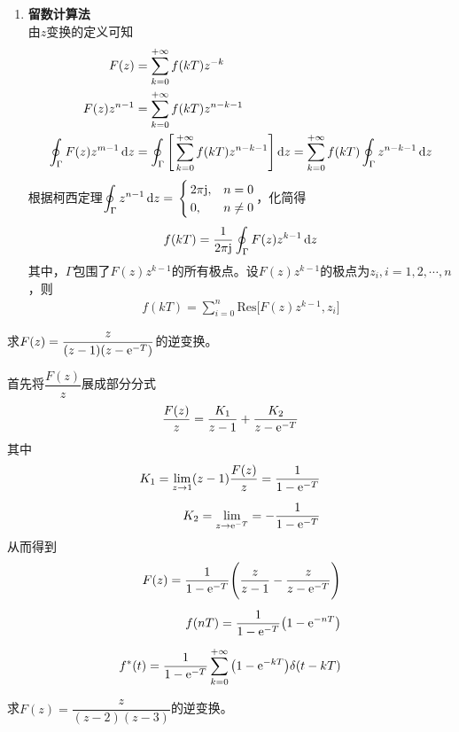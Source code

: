 \begin{enumerate}[\textbf{方法} 1 ]
	\item \textbf{留数计算法}\\
	由$z$变换的定义可知
	\begin{align}
		F(z) &= \sum_{k=0}^{+\infty} f(kT)z^{-k}\\
		F(z)z^{n-1} &= \sum_{k=0}^{+\infty}f(kT)z^{n-k-1}\\
		\oint_\Gamma F(z)z^{m-1}\,{\rm{d}} z &=\oint_\Gamma \Bigg[\sum_{k=0}^{+\infty}f(kT)z^{n-k-1}\Bigg]\,{\rm{d}} z = \sum_{k=0}^{+\infty} f(kT)\oint_\Gamma z^{n-k-1}\,{\rm{d}} z
	\end{align}
	根据柯西定理$\displaystyle \oint_\Gamma z^{n-1}\, {\rm{d}} z = 
	\,
	\begin{cases}
		\, 2\pi \text{j}, &n = 0\\
		\, 0, & n \neq 0
	\end{cases}
	$，化简得
	\begin{align}
		f(kT) = \dfrac{1}{2\pi\text{j}} \oint_\Gamma F(z)z^{k-1} \, {\rm{d}} z
	\end{align}
	其中，$\Gamma$包围了$F(z)z^{k-1}$的所有极点。设$F(z)z^{k-1}$的极点为$z_i,i=1,2,\cdots,n$，则
	\begin{align}
		f(kT) = \sum_{i=0}^n \text{Res}\big[F(z)z^{k-1},z_i\big]
	\end{align}
\end{enumerate}

\examples 求$F(z)=\dfrac{z}{(z-1)(z-{\rm{e}}^{-T})}$的逆变换。

\solve 首先将$\dfrac{F(z)}{z}$展成部分分式
\[
\dfrac{F(z)}{z} = \dfrac{K_1}{z-1} + \dfrac{K_2}{z-{\rm{e}}^{-T}}
\]
其中
\begin{align*}
	K_1 = \lim\limits_{z \to 1} (z-1)\dfrac{F(z)}{z} = \dfrac{1}{1- {\rm{e}}^{-T}}\\[0.5em]
	K_2 = \lim\limits_{z \to {\rm{e}}^{-T}} = - \dfrac{1}{1 - {\rm{e}}^{-T}}
\end{align*}
从而得到
\begin{align}
	F(z) = \dfrac{1}{1 - {\rm{e}}^{-T}}\Bigg(\dfrac{z}{z-1} - \dfrac{z}{z-{\rm{e}}^{-T}}\Bigg)\\[0.5em]
	f(nT) = \dfrac{1}{1 - {\rm{e}}^{-T}}\big(1 - {\rm{e}}^{-nT}\big)\\[0.5em]
	f^*(t) = \dfrac{1}{1 - {\rm{e}}^{-T}}\sum_{k = 0}^{+\infty} \big(1 - {\rm{e}}^{-kT}\big)\delta (t - kT)
\end{align}

\examples 求$F(z)=\dfrac{z}{(z-2)(z-3)}$的逆变换。

